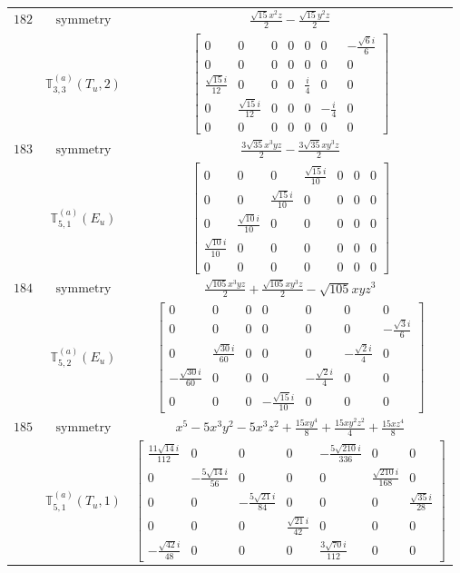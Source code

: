 \documentclass[fleqn,8pt,landscape]{jsarticle}
\begin{document}
\begin{longtable}{ccc}
$ 182 $ & $ \text{symmetry} $ & $ \frac{\sqrt{15} x^{2} z}{2} - \frac{\sqrt{15} y^{2} z}{2} $ \\
$  $ & $ \mathbb{T}_{3,3}^{(a)}(T_{u},2) $ & $ \begin{bmatrix} 0 & 0 & 0 & 0 & 0 & 0 & - \frac{\sqrt{6} i}{6} \\ 0 & 0 & 0 & 0 & 0 & 0 & 0 \\ \frac{\sqrt{15} i}{12} & 0 & 0 & 0 & \frac{i}{4} & 0 & 0 \\ 0 & \frac{\sqrt{15} i}{12} & 0 & 0 & 0 & - \frac{i}{4} & 0 \\ 0 & 0 & 0 & 0 & 0 & 0 & 0 \end{bmatrix} $ \\ \hline
$ 183 $ & $ \text{symmetry} $ & $ \frac{3 \sqrt{35} x^{3} y z}{2} - \frac{3 \sqrt{35} x y^{3} z}{2} $ \\
$  $ & $ \mathbb{T}_{5,1}^{(a)}(E_{u}) $ & $ \begin{bmatrix} 0 & 0 & 0 & \frac{\sqrt{15} i}{10} & 0 & 0 & 0 \\ 0 & 0 & \frac{\sqrt{15} i}{10} & 0 & 0 & 0 & 0 \\ 0 & \frac{\sqrt{10} i}{10} & 0 & 0 & 0 & 0 & 0 \\ \frac{\sqrt{10} i}{10} & 0 & 0 & 0 & 0 & 0 & 0 \\ 0 & 0 & 0 & 0 & 0 & 0 & 0 \end{bmatrix} $ \\ \hline
$ 184 $ & $ \text{symmetry} $ & $ \frac{\sqrt{105} x^{3} y z}{2} + \frac{\sqrt{105} x y^{3} z}{2} - \sqrt{105} x y z^{3} $ \\
$  $ & $ \mathbb{T}_{5,2}^{(a)}(E_{u}) $ & $ \begin{bmatrix} 0 & 0 & 0 & 0 & 0 & 0 & 0 \\ 0 & 0 & 0 & 0 & 0 & 0 & - \frac{\sqrt{3} i}{6} \\ 0 & \frac{\sqrt{30} i}{60} & 0 & 0 & 0 & - \frac{\sqrt{2} i}{4} & 0 \\ - \frac{\sqrt{30} i}{60} & 0 & 0 & 0 & - \frac{\sqrt{2} i}{4} & 0 & 0 \\ 0 & 0 & 0 & - \frac{\sqrt{15} i}{10} & 0 & 0 & 0 \end{bmatrix} $ \\ \hline
$ 185 $ & $ \text{symmetry} $ & $ x^{5} - 5 x^{3} y^{2} - 5 x^{3} z^{2} + \frac{15 x y^{4}}{8} + \frac{15 x y^{2} z^{2}}{4} + \frac{15 x z^{4}}{8} $ \\
$  $ & $ \mathbb{T}_{5,1}^{(a)}(T_{u},1) $ & $ \begin{bmatrix} \frac{11 \sqrt{14} i}{112} & 0 & 0 & 0 & - \frac{5 \sqrt{210} i}{336} & 0 & 0 \\ 0 & - \frac{5 \sqrt{14} i}{56} & 0 & 0 & 0 & \frac{\sqrt{210} i}{168} & 0 \\ 0 & 0 & - \frac{5 \sqrt{21} i}{84} & 0 & 0 & 0 & \frac{\sqrt{35} i}{28} \\ 0 & 0 & 0 & \frac{\sqrt{21} i}{42} & 0 & 0 & 0 \\ - \frac{\sqrt{42} i}{48} & 0 & 0 & 0 & \frac{3 \sqrt{70} i}{112} & 0 & 0 \end{bmatrix} $ \\ \hline

\end{longtable}
\end{document}
